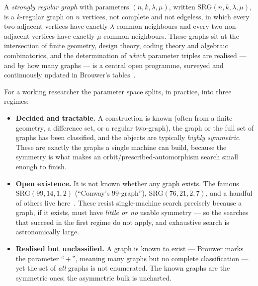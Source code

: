 \documentclass[11pt]{article}
\theoremstyle{definition}
\newcommand{\SRG}[1]{\mathrm{SRG}(#1)}
\begin{document}
A \emph{strongly regular graph} with parameters $(n,k,\lambda,\mu)$, written
$\SRG{n,k,\lambda,\mu}$, is a $k$-regular graph on $n$ vertices, not complete and not
edgeless, in which every two adjacent vertices have exactly $\lambda$ common neighbours
and every two non-adjacent vertices have exactly $\mu$ common neighbours. These graphs
sit at the intersection of finite geometry, design theory, coding theory and algebraic
combinatorics, and the determination of \emph{which} parameter triples are realised ---
and by how many graphs --- is a central open programme, surveyed and continuously
updated in Brouwer's tables~\cite{brouwer-table,bcn,bvm-srg}.

For a working researcher the parameter space splits, in practice, into three regimes:

\begin{itemize}
  \item \textbf{Decided and tractable.} A construction is known (often from a finite
  geometry, a difference set, or a regular two-graph), the graph or the full set of
  graphs has been classified, and the objects are typically \emph{highly symmetric}.
  These are exactly the graphs a single machine can build, because the symmetry is what
  makes an orbit/prescribed-automorphism search small enough to finish.

  \item \textbf{Open existence.} It is not known whether any graph exists. The famous
  $\SRG{99,14,1,2}$ (``Conway's $99$-graph''), $\SRG{76,21,2,7}$, and a handful of
  others live here~\cite{brouwer-table}. These resist single-machine search precisely
  because a graph, if it exists, must have \emph{little or no} usable symmetry --- so
  the searches that succeed in the first regime do not apply, and exhaustive search is
  astronomically large.

  \item \textbf{Realised but unclassified.} A graph is known to exist --- Brouwer marks
  the parameter ``\,$+$\,'', meaning many graphs but no complete classification --- yet
  the set of \emph{all} graphs is not enumerated. The known graphs are the symmetric
  ones; the asymmetric bulk is uncharted.
\end{itemize}
\end{document}
